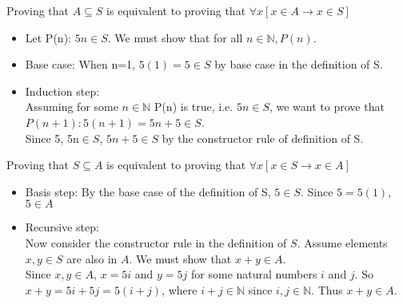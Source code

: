 \documentclass[solution, letterpaper]{cs20}
\begin{document}
\begin{solution}
\subsolution Proving that $A\subseteq S$ is equivalent to proving that $\forall x[x\in A\rightarrow x\in S]$
\begin{itemize}
\item Let P(n): $5n\in S$. We must show that for all $n\in\mathbb{N}, P(n)$.
\item Base case: When n=1, $5(1)=5\in S$ by base case in the definition of S.
\item Induction step: \\
Assuming for some $n\in\mathbb{N}$ P(n) is true, i.e. $5n\in S$, we want to prove that $P(n+1): 5(n+1)=5n+5\in S$.\\
Since 5, 5n$\in S$, $5n+5\in S$ by the constructor rule of definition of S.
\end{itemize}
\subsolution Proving that $S\subseteq A$ is equivalent to proving that $\forall x[x\in S\rightarrow x\in A]$
\begin{itemize}
\item Basis step: By the base case of the definition of S, $5\in S$. Since $5=5(1)$, $5\in A$
\item Recursive step: \\
Now consider the constructor rule in the definition of $S$. Assume elements $x,y\in S$ are also in $A$. We must show that $x+y\in A$.\\
Since $x,y\in A$, $x=5i$ and $y=5j$ for some natural numbers $i$ and $j$. So $x+y=5i+5j=5(i+j)$, where $i+j\in\mathbb{N}$ since $i,j\in\mathbb{N}$. Thus $x+y\in A.$
\end{itemize}
\end{solution}
\end{document}
